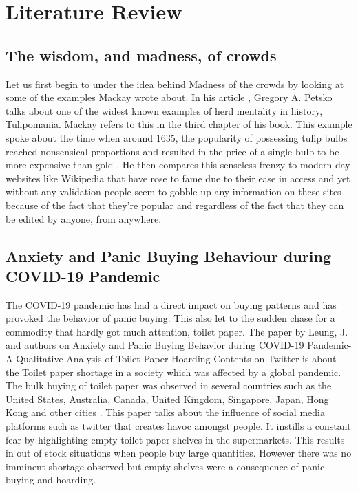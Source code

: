 \documentclass[runningheads]{llncs}
\begin{document}
\section{Literature Review}
\subsection{The wisdom, and madness, of crowds}
Let us first begin to under the idea behind Madness of the crowds by looking at some of the examples Mackay wrote about. In his article \cite{ref_lncs6}, Gregory A. Petsko talks about one of the widest known examples of herd mentality in history, Tulipomania. Mackay refers to this in the third chapter of his book. This example spoke about the time when around 1635, the popularity of possessing tulip bulbs reached nonsensical proportions and resulted in the price of a single bulb to be more expensive than gold \cite{ref_lncs7}. He then compares this senseless frenzy to modern day websites like Wikipedia that have rose to fame due to their ease in access and yet without any validation people seem to gobble up any information on these sites because of the fact that they’re popular and regardless of the fact that they can be edited by anyone, from anywhere. 

\subsection{Anxiety and Panic Buying Behaviour during COVID-19 Pandemic}
The COVID-19 pandemic has had a direct impact on buying patterns and has provoked the behavior of panic buying.
This also let to the sudden chase for a commodity that hardly got much attention, toilet paper. The paper by Leung, J. and authors on Anxiety and Panic Buying Behavior during COVID-19 Pandemic-A Qualitative Analysis of Toilet Paper Hoarding Contents on Twitter is about the Toilet paper shortage in a society which was affected by a global pandemic.
The bulk buying of toilet paper was observed in several countries such as the United States, Australia, Canada, United Kingdom, Singapore, Japan, Hong Kong and other cities \cite{ref_lncs2}.  
This paper talks about the influence of social media platforms such as twitter that creates havoc amongst people. It instills a constant fear by highlighting empty toilet paper shelves in the supermarkets. This results in out of stock situations when people buy large quantities. However there was no imminent shortage observed but empty shelves were a consequence of panic buying and hoarding. \\
\end{document}
